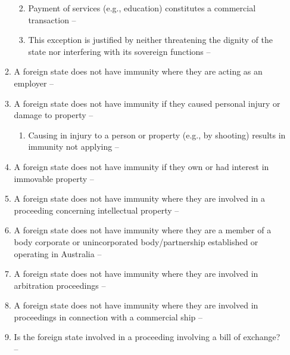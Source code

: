 \begin{enumerate}
\begin{enumerate}
\begin{enumerate}
\begin{enumerate}
            \end{enumerate}
            \item Payment of services (e.g., education) constitutes a commercial transaction -- 
            \item This exception is justified by neither threatening the dignity of the state nor interfering with its sovereign functions -- 
        \end{enumerate}
        \item A foreign state does not have immunity where they are acting as an employer -- 
        \item A foreign state does not have immunity if they caused personal injury or damage to property -- 
        \begin{enumerate}
            \item Causing in injury to a person or property (e.g., by shooting) results in immunity not applying -- 
        \end{enumerate}
        \item A foreign state does not have immunity if they own or had interest in immovable property -- 
        \item A foreign state does not have immunity where they are involved in a proceeding concerning intellectual property -- 
        \item A foreign state does not have immunity where they are a member of a body corporate or unincorporated body/partnership established or operating in Australia -- 
        \item A foreign state does not have immunity where they are involved in arbitration proceedings -- 
        \item A foreign state does not have immunity where they are involved in proceedings in connection with a commercial ship -- 
        \item Is the foreign state involved in a proceeding involving a bill of exchange? -- 

\end{enumerate}
\end{enumerate}
